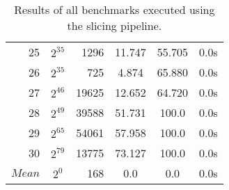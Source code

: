\begin{table}[b!]
\begin{tabular}{rSrSSS}
    25 & {$2^{35}$} & 1296 & 11.747 & 55.705 & 0.0s \\
    26 & {$2^{35}$} & 725 & 4.874 & 65.880 & 0.0s \\
    27 & {$2^{46}$} & 19625 & 12.652 & 64.720 & 0.0s \\
    28 & {$2^{49}$} & 39588 & 51.731 & 100.0 & 0.0s \\
    29 & {$2^{65}$} & 54061 & 57.958 & 100.0 & 0.0s \\
    30 & {$2^{79}$} & 13775 & 73.127 & 100.0 & 0.0s \\	\midrule
	{$Mean$} & {$2^{0}$} & 168 & 0.0 & 0.0 & 0.0s \\	\bottomrule
\end{tabular}
\caption{Results of all benchmarks executed using the slicing pipeline.}
\label{tab:resultsslicing}
\end{table}

